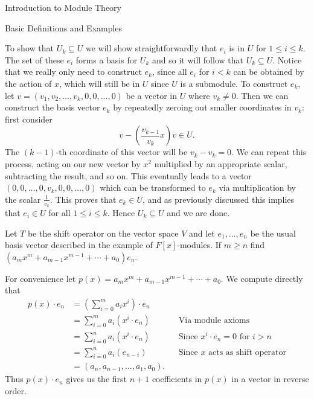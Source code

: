 \begin{chapter}{Introduction to Module Theory}
\begin{section}{Basic Definitions and Examples}
\begin{solution}
To show that $U_k\subseteq U$  we will show straightforwardly that $e_i$ is in $U$ for $1\le i\le k$. The set of these $e_i$ forms a basis for $U_k$ and so it will follow that $U_k\subseteq U$. Notice that we really only need to construct $e_k$, since all $e_i$ for $i<k$ can be obtained by the action of $x$, which will still be in $U$ since $U$ is a submodule. To construct $e_k$, let $v = (v_1,v_2,\ldots,v_k,0,0,\ldots, 0)$ be a vector in $U$ where $v_k\neq 0$. Then we can construct the basis vector $e_k$ by repeatedly zeroing out smaller coordinates in $v_k$: first consider \[
v-\left(\frac{v_{k-1}}{v_k} x\right) v \in U.
 \] 
 The $(k-1)$-th coordinate of this vector will be $v_k-v_k = 0$. We can repeat this process, acting on our new vector by $x^2$ multiplied by an appropriate scalar, subtracting the result, and so on. This eventually leads to a vector $(0,0,\ldots,0,v_k,0,0,\ldots,0)$ which can be transformed to $e_k$ via multiplication by the scalar $\frac{1}{v_k}$. This proves that $e_k\in U$, and as previously discussed this implies that $e_i\in U$ for all $1\le i\le k$. Hence $U_k\subseteq U$ and we are done.
\end{solution}\oneperpage



\begin{problem}\label{ex:10.1.17}
Let $T$ be the shift operator on the vector space $V$ and let $e_1,\ldots,e_n$ be the usual basis vector described in the example of $F[x]$-modules. If $m\ge n$ find $(a_mx^m + a_{m-1}x^{m-1}+\cdots +a_0)e_n$. 
\end{problem}
\begin{solution}
For convenience let $p(x) = a_mx^m + a_{m-1}x^{m-1} + \cdots + a_0$. We compute directly that \begin{align*}
p(x)\cdot e_n &= \left(\sum_{i=0}^m a_ix^i\right)\cdot e_n\\
& = \sum_{i=0}^m a_i(x^i\cdot e_n)&&\text{Via module axioms}\\
& = \sum_{i=0}^n a_i(x^i\cdot e_n) &&\text{Since $x^i\cdot e_n = 0$ for $i>n$}\\
& = \sum_{i=0}^n a_i(e_{n-i}) &&\text{Since $x$ acts as shift operator}\\
& = (a_n,a_{n-1},\ldots, a_1,a_0).
\end{align*}
Thus $p(x)\cdot e_n$ gives us the first $n+1$ coefficients in $p(x)$ in a vector in reverse order.
\end{solution}\oneperpage




\end{section}
\end{chapter}
